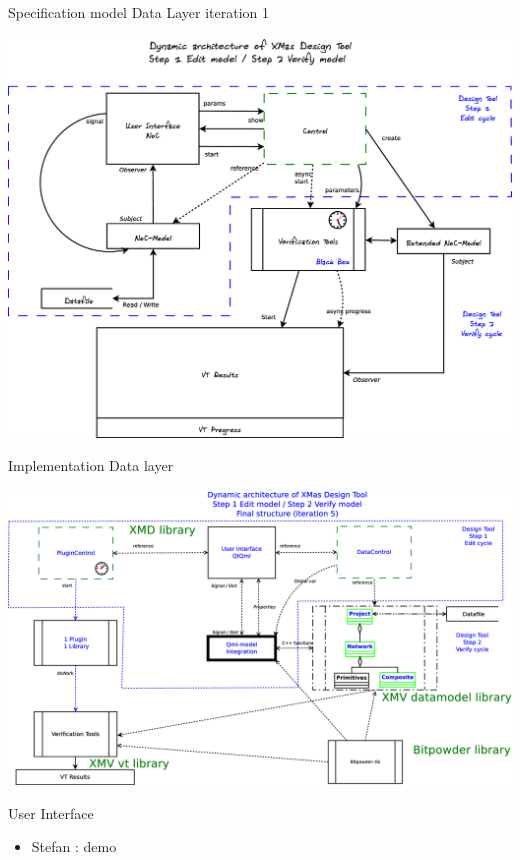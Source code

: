 \documentclass[11pt]{beamer}
\begin{document}
\begin{frame}{Specification model Data Layer iteration 1}

	\includegraphics[width=.95\linewidth]{1c-architecture-dynamic-1}

\end{frame}

\begin{frame}{Implementation Data layer}

	\includegraphics[width=.95\linewidth]{1c-architecture-dynamic-2}

\end{frame}

\begin{frame}{User Interface}

	\begin{itemize}
		\item Stefan : demo
	\end{itemize}

\end{frame}
\end{document}
